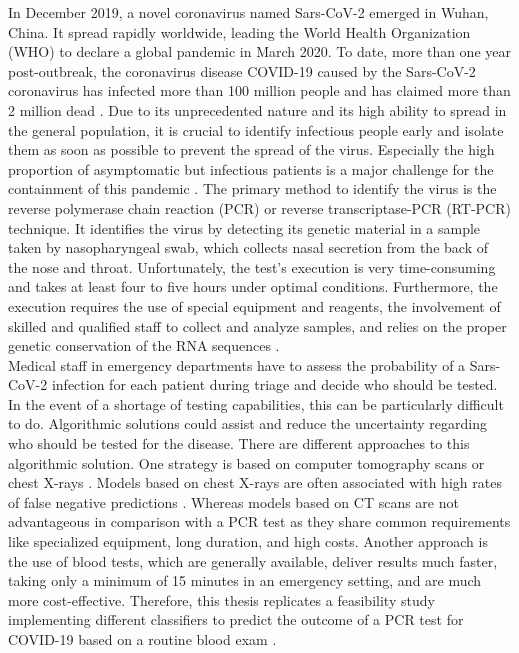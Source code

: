 In December 2019, a novel coronavirus named Sars-CoV-2 emerged in Wuhan, China. 
It spread rapidly worldwide, leading the World Health Organization (WHO) 
to declare a global pandemic in March 2020. To date, more than one year 
post-outbreak, the coronavirus disease COVID-19 caused by the Sars-CoV-2 
coronavirus has infected more than 100 million people and has claimed more than 
2 million dead \cite{RN204}. Due to its unprecedented nature and its high 
ability to spread in the general population, it is crucial to identify 
infectious people early and isolate them as soon as possible to 
prevent the spread of the virus. Especially the high proportion of asymptomatic 
but infectious patients is a major challenge for the containment of this 
pandemic \cite{RN205}. The primary method to identify the virus is the reverse 
polymerase chain reaction (PCR) or reverse transcriptase-PCR (RT-PCR) 
technique. It identifies the virus by detecting its genetic 
material in a sample taken by nasopharyngeal swab, which collects nasal 
secretion from the back of the nose and throat. Unfortunately, the test's 
execution is very time-consuming and takes at least four to five hours under 
optimal conditions. 
Furthermore, the execution requires the use of special equipment and reagents, 
the involvement of skilled and qualified staff to collect and analyze samples, 
and relies on the proper genetic conservation of the RNA sequences 
\cite{RN201, RN202}.
\\
Medical staff in emergency departments have to assess the probability of a 
Sars-CoV-2 infection for each patient during triage and decide 
who should be tested. In the event of a shortage of testing capabilities, this 
can be particularly difficult to do. Algorithmic solutions could assist and 
reduce the uncertainty regarding who should be tested for the 
disease. There are different approaches to this algorithmic solution.
One strategy is based on computer tomography scans or chest X-rays 
\cite{RN200}. Models based on chest X-rays are often associated with high rates 
of false negative predictions \cite{RN200, RN206}. Whereas models based on CT 
scans are not advantageous in comparison with a PCR test as they share common 
requirements like specialized equipment, long duration, and high costs.
Another approach is the use of blood tests, which are generally available, 
deliver results much faster, taking only a minimum of 15 minutes in an 
emergency setting, and are much more cost-effective.
Therefore, this thesis replicates a feasibility study implementing different 
classifiers to predict the outcome of a PCR test for COVID-19 based on a 
routine blood exam \cite{RN127}.
